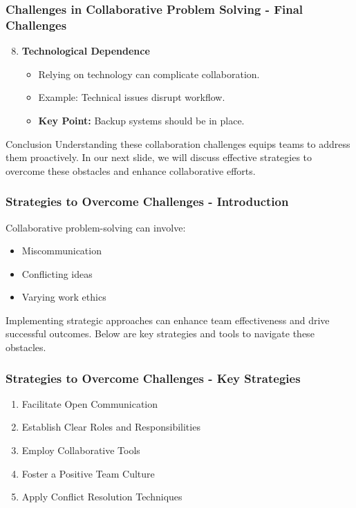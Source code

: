 \documentclass{beamer}
\begin{document}
\begin{frame}[fragile]
    \frametitle{Challenges in Collaborative Problem Solving - Final Challenges}
    \begin{enumerate}
        \setcounter{enumi}{7}
        \item \textbf{Technological Dependence}
            \begin{itemize}
                \item Relying on technology can complicate collaboration.
                \item Example: Technical issues disrupt workflow.
                \item \textbf{Key Point:} Backup systems should be in place.
            \end{itemize}
    \end{enumerate}

    \begin{block}{Conclusion}
        Understanding these collaboration challenges equips teams to address them proactively. In our next slide, we will discuss effective strategies to overcome these obstacles and enhance collaborative efforts.
    \end{block}
\end{frame}

\begin{frame}[fragile]
    \frametitle{Strategies to Overcome Challenges - Introduction}
    Collaborative problem-solving can involve:
    \begin{itemize}
        \item Miscommunication
        \item Conflicting ideas
        \item Varying work ethics
    \end{itemize}
    Implementing strategic approaches can enhance team effectiveness and drive successful outcomes. Below are key strategies and tools to navigate these obstacles.
\end{frame}

\begin{frame}[fragile]
    \frametitle{Strategies to Overcome Challenges - Key Strategies}
    \begin{enumerate}
        \item Facilitate Open Communication
        \item Establish Clear Roles and Responsibilities
        \item Employ Collaborative Tools
        \item Foster a Positive Team Culture
        \item Apply Conflict Resolution Techniques
    \end{enumerate}
\end{frame}
\end{document}
